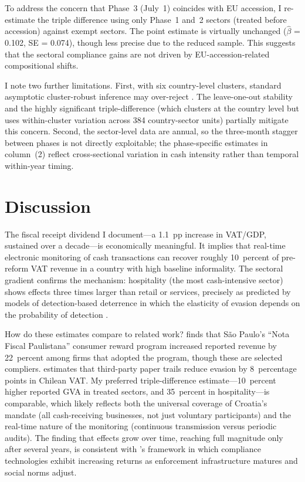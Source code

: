 \documentclass[12pt]{article}
\begin{document}
To address the concern that Phase~3 (July~1) coincides with EU accession, I re-estimate the triple difference using only Phase~1 and~2 sectors (treated before accession) against exempt sectors. The point estimate is virtually unchanged ($\hat{\beta}$ = 0.102, SE = 0.074), though less precise due to the reduced sample. This suggests that the sectoral compliance gains are not driven by EU-accession-related compositional shifts.

I note two further limitations. First, with six country-level clusters, standard asymptotic cluster-robust inference may over-reject \citep{cameron2008}. The leave-one-out stability and the highly significant triple-difference (which clusters at the country level but uses within-cluster variation across 384 country-sector units) partially mitigate this concern. Second, the sector-level data are annual, so the three-month stagger between phases is not directly exploitable; the phase-specific estimates in  column~(2) reflect cross-sectional variation in cash intensity rather than temporal within-year timing.


\section{Discussion}
\label{sec:discussion}

The fiscal receipt dividend I document---a 1.1~pp increase in VAT/GDP, sustained over a decade---is economically meaningful. It implies that real-time electronic monitoring of cash transactions can recover roughly 10~percent of pre-reform VAT revenue in a country with high baseline informality. The sectoral gradient confirms the mechanism: hospitality (the most cash-intensive sector) shows effects three times larger than retail or services, precisely as predicted by models of detection-based deterrence in which the elasticity of evasion depends on the probability of detection \citep{allingham1972, kleven2011}.

How do these estimates compare to related work? \citet{naritomi2019} finds that S\~{a}o Paulo's ``Nota Fiscal Paulistana'' consumer reward program increased reported revenue by 22~percent among firms that adopted the program, though these are selected compliers. \citet{pomeranz2015} estimates that third-party paper trails reduce evasion by 8~percentage points in Chilean VAT. My preferred triple-difference estimate---10~percent higher reported GVA in treated sectors, and 35~percent in hospitality---is comparable, which likely reflects both the universal coverage of Croatia's mandate (all cash-receiving businesses, not just voluntary participants) and the real-time nature of the monitoring (continuous transmission versus periodic audits). The finding that effects grow over time, reaching full magnitude only after several years, is consistent with \citet{slemrod2019}'s framework in which compliance technologies exhibit increasing returns as enforcement infrastructure matures and social norms adjust.
\end{document}
